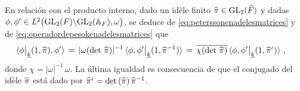 \begin{obsOperadorDePesoKAdjunto}\label{obs:operadordepesokadjunto}
	En relaci\'{o}n con el producto interno, dado un id\`{e}le finito
	$\widehat{\pi}\in\mathrm{GL}_{2}(\widehat{F})$ y dadas
	$\phi,\phi'\in \mathit{L}^{2}\big(\mathrm{GL}_{2}(F)\backslash\mathrm{GL}_{2}(\mathbb{A}_{F}),{\omega}\big)$, se deduce de
	\eqref{eq:peterssonenadelesmatrices} y de
	\eqref{eq:operadordepesokenadelesmatrices} que
	\begin{align*}
		\langle \phi\operadormatrices{\peso{k}}{(1,\hhat{\pi})},
			\phi'\rangle
			& \,=\,|\omega(\det\,\hhat{\pi})|^{-1}\,
				\langle\phi,\phi'\operadormatrices{\peso{k}}{%
				(1,\hhat{\pi}^{-1})}\rangle
			\,=\,\lconj{\chi(\det\,\hhat{\pi})}\,
			\langle\phi,\phi'\operadormatrices{\peso{k}}{%
				(1,\hhat{\pi}^\iota)}\rangle
		\text{ ,}
	\end{align*}
	donde $\chi=|\omega|^{-1}\,\omega$. La \'{u}ltima igualdad es
	consecuencia de que el conjugado del id\`{e}le $\widehat{\pi}$ est\'{a}
	dado por $\widehat{\pi}^\iota=\mathrm{det}\,(\widehat{\pi})\,\widehat{\pi}^{-1}$.
\end{obsOperadorDePesoKAdjunto}
